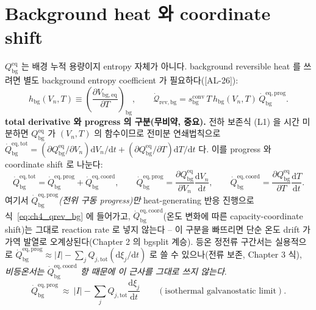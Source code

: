 \documentclass[11pt,a4paper]{article}
\newcommand{\dd}{\mathrm{d}}
\newcommand{\eq}{\mathrm{eq}}
\newcommand{\bg}{\mathrm{bg}}
\newcommand{\tot}{\mathrm{tot}}
\newcommand{\rev}{\mathrm{rev}}
\newcommand{\conv}{\mathrm{conv}}
\newcommand{\prog}{\mathrm{prog}}
\newcommand{\coord}{\mathrm{coord}}
\newcommand{\AL}[1]{\textsf{[AL-#1]}}
\begin{document}
\section{Background heat 와 coordinate shift}\label{sec:ch4_bg}
$Q_\bg^{\eq}$ 는 배경 누적 용량이지 entropy 자체가 아니다. background reversible heat 를 쓰려면 별도 background
entropy coefficient 가 필요하다(\AL{26}):
\begin{equation}
h_\bg(V_n,T)\equiv\left(\frac{\partial V_{\bg,\eq}}{\partial T}\right)_{\mathrm{bg}},\qquad
\dot{\mathcal Q}_{\rev,\bg}=s_\bg^{\conv}\,T\,h_\bg(V_n,T)\,\dot Q_\bg^{\eq,\prog}.
\label{eq:ch4_qrev_bg}
\end{equation}
\textbf{total derivative 와 progress 의 구분(무비약, 중요).} 전하 보존식 (L1) 을 시간 미분하면 $Q_\bg^{\eq}$ 가
$(V_n,T)$ 의 함수이므로 전미분 연쇄법칙으로 $\dot Q_\bg^{\eq,\mathrm{tot}}=(\partial Q_\bg^{\eq}/\partial V_n)\dd V_n/\dd t
+(\partial Q_\bg^{\eq}/\partial T)\dd T/\dd t$ 다. 이를 progress 와 coordinate shift 로 나눈다:
\begin{equation}
\dot Q_\bg^{\eq,\mathrm{tot}}=\dot Q_\bg^{\eq,\prog}+\dot Q_\bg^{\eq,\coord},\qquad
\dot Q_\bg^{\eq,\prog}=\frac{\partial Q_\bg^{\eq}}{\partial V_n}\frac{\dd V_n}{\dd t},\qquad
\dot Q_\bg^{\eq,\coord}=\frac{\partial Q_\bg^{\eq}}{\partial T}\frac{\dd T}{\dd t}.
\label{eq:ch4_qbg_split}
\end{equation}
여기서 \emph{$\dot Q_\bg^{\eq,\prog}$(전위 구동 progress)만} heat-generating 반응 진행으로 식~\eqref{eq:ch4_qrev_bg}
에 들어가고, $\dot Q_\bg^{\eq,\coord}$(온도 변화에 따른 capacity-coordinate shift)는 그대로 reaction rate 로 넣지
않는다 -- 이 구분을 빠뜨리면 단순 온도 drift 가 가역 발열로 오계상된다(Chapter 2 의 bgsplit 계승). 등온 정전류
구간서는 실용적으로 $\dot Q_\bg^{\eq,\prog}\approx|I|-\sum_j Q_{j,\tot}(\dd\xi_j/\dd t)$ 로 쓸 수 있으나(전류 보존,
Chapter 3 식), \emph{비등온서는 $\dot Q_\bg^{\eq,\coord}$ 항 때문에 이 근사를 그대로 쓰지 않는다}.
\begin{equation}
\dot Q_\bg^{\eq,\prog}\ \approx\ |I|-\sum_j Q_{j,\tot}\frac{\dd\xi_j}{\dd t}\qquad(\text{isothermal galvanostatic limit}).
\label{eq:ch4_qbg_iso}
\end{equation}

\end{document}

